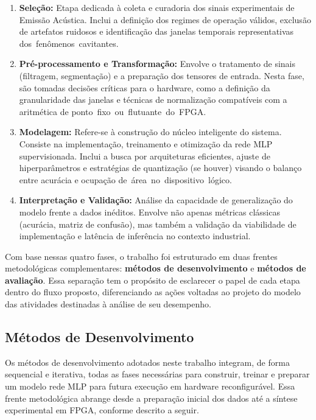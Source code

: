 \begin{enumerate}
	 \item \textbf{Seleção:} Etapa dedicada à coleta e curadoria dos sinais experimentais de Emissão Acústica. Inclui a definição dos regimes de operação válidos, exclusão de artefatos ruidosos e identificação das janelas temporais representativas \mbox{dos fenômenos cavitantes.}
	
	\item \textbf{Pré-processamento e Transformação:} Envolve o tratamento de sinais (filtragem, segmentação) e a preparação dos tensores de entrada. Nesta fase, são tomadas decisões críticas para o hardware, como a definição da granularidade das janelas e técnicas de normalização compatíveis com a aritmética de \mbox{ponto fixo ou flutuante do FPGA.}
	
	\item \textbf{Modelagem:} Refere-se à construção do núcleo inteligente do sistema. Consiste na implementação, treinamento e otimização da rede MLP supervisionada. Inclui a busca por arquiteturas eficientes, ajuste de hiperparâmetros e estratégias de quantização (se houver) visando o balanço entre acurácia e ocupação \mbox{de área no dispositivo lógico.}
	
	\item \textbf{Interpretação e Validação:} Análise da capacidade de generalização do modelo frente a dados inéditos. Envolve não apenas métricas clássicas (acurácia, matriz de confusão), mas também a validação da viabilidade de implementação e latência de inferência no contexto industrial.
\end{enumerate}

Com base nessas quatro fases, o trabalho foi estruturado em duas frentes metodológicas complementares: \textbf{métodos de desenvolvimento} e \textbf{métodos de avaliação}. Essa separação tem o propósito de esclarecer o papel de cada etapa dentro do fluxo proposto, diferenciando as ações voltadas ao projeto do modelo das atividades destinadas à análise de seu desempenho.

\subsection{Métodos de Desenvolvimento}

Os métodos de desenvolvimento adotados neste trabalho integram, de forma 
sequencial e iterativa, todas as fases necessárias para construir, treinar e 
preparar um modelo rede MLP para futura execução em hardware reconfigurável. 
Essa frente metodológica abrange desde a preparação inicial dos dados até a 
síntese experimental em FPGA, conforme descrito a seguir.

